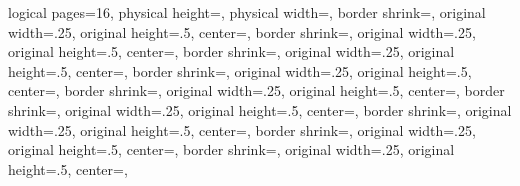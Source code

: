 %
%
%
%
%
%

{%
	\edef\pgfpageoptionheight{\the\paperheight}%
	\edef\pgfpageoptionwidth{\the\paperwidth}%
	\edef\pgfpageoptionborder{1pt}%
}%
{
  \pgfpagesphysicalpageoptions%
  {%
    logical pages=16,%
    physical height=\pgfpageoptionheight,%
    physical width=\pgfpageoptionwidth,%
  }%
%
%
  {%
    border shrink=\pgfpageoptionborder,%
    original width=.25\pgfpageoptionheight,%
    original height=.5\pgfpageoptionwidth,%
	center=\pgfpoint{0pt}{\pgfphysicalheight},%
  }%
  {%
    border shrink=\pgfpageoptionborder,%
    original width=.25\pgfpageoptionheight,%
    original height=.5\pgfpageoptionwidth,%
	center=\pgfpoint{.5\pgfphysicalwidth}{\pgfphysicalheight},%
  }%
  {%
  	border shrink=\pgfpageoptionborder,%
  	original width=.25\pgfpageoptionheight,%
  	original height=.5\pgfpageoptionwidth,%
	center=\pgfpoint{0pt}{.75\pgfphysicalheight},%
  }%
  {%
  	border shrink=\pgfpageoptionborder,%
	original width=.25\pgfpageoptionheight,%
	original height=.5\pgfpageoptionwidth,%
	center=\pgfpoint{.5\pgfphysicalwidth}{.75\pgfphysicalheight},%
  }%
  {%
	border shrink=\pgfpageoptionborder,%
	original width=.25\pgfpageoptionheight,%
	original height=.5\pgfpageoptionwidth,%
	center=\pgfpoint{0pt}{.5\pgfphysicalheight},%
  }%
  {%
	border shrink=\pgfpageoptionborder,%
	original width=.25\pgfpageoptionheight,%
	original height=.5\pgfpageoptionwidth,%
	center=\pgfpoint{.5\pgfphysicalwidth}{.5\pgfphysicalheight},%
  }%
  {%
	border shrink=\pgfpageoptionborder,%
	original width=.25\pgfpageoptionheight,%
	original height=.5\pgfpageoptionwidth,%
	center=\pgfpoint{0pt}{.25\pgfphysicalheight},%
  }%
  {%
	border shrink=\pgfpageoptionborder,%
	original width=.25\pgfpageoptionheight,%
	original height=.5\pgfpageoptionwidth,%
	center=\pgfpoint{.5\pgfphysicalwidth}{.25\pgfphysicalheight},%
  }%
%
%
  {%
	border shrink=\pgfpageoptionborder,%
	original width=.25\pgfpageoptionheight,%
	original height=.5\pgfpageoptionwidth,%
	center=\pgfpoint{.5\pgfphysicalwidth}{\pgfphysicalheight},%
}}
